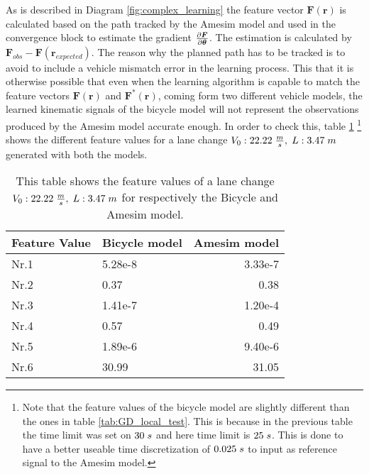 As is described in Diagram \ref{fig:complex_learning} the feature vector $\bm{F}(\bm{r})$ is calculated based on the path tracked by the Amesim model and used in the convergence block to estimate the gradient $\pdv{\bm{F}}{\bm{\theta}}$. The estimation is calculated by $\bm{F}_{obs} - \bm{F}(\bm{r}_{expected})$. The reason why the planned path has to be tracked is to avoid to include a vehicle mismatch error in the learning process. This that it is otherwise possible that even when the learning algorithm is capable to match the feature vectors $\bm{F}(\bm{r})$ and  $\bm{F}^*(\bm{r})$, coming form two different vehicle models, the learned kinematic signals of the bicycle model will not represent the observations produced by the Amesim model accurate enough. In order to check this, table \ref{tab:comparinson_models} \footnote{Note that the feature values of the bicycle model are slightly different than the ones in table \ref{tab:GD_local_test}. This is because in the previous table the time limit was set on $30 \hspace{1mm}s$ and here time limit is $25 \hspace{1mm}s$. This is done to have a better useable time discretization of $0.025\hspace{1mm}s$ to input as reference signal to the Amesim model.} shows the different feature values for a lane change $V_0:22.22\hspace{1mm}\frac{m}{s},\hspace{1mm} L:3.47\hspace{1mm}m$ generated with both the models.\\


\begin{table}[h!]
	\centering
	\begin{tabular}{@{}llr@{}} \toprule
		Feature Value    & Bicycle model & Amesim model\\ \midrule
		Nr.1       		 & 5.28e-8    & 3.33e-7 \\
		Nr.2       		 & 0.37       & 0.38  \\
		Nr.3       		 & 1.41e-7    & 1.20e-4 \\
		Nr.4       		 & 0.57       & 0.49  \\
		Nr.5       		 & 1.89e-6    & 9.40e-6 \\
		Nr.6       		 & 30.99      & 31.05\\ \bottomrule
	\end{tabular}
	\caption{This table shows the feature values of a lane change $V_0:22.22\hspace{1mm}\frac{m}{s},\hspace{1mm} L:3.47\hspace{1mm}m$ for respectively the Bicycle and Amesim model.}
	\label{tab:comparinson_models}
\end{table}

